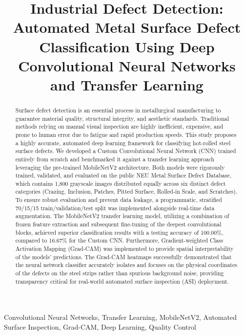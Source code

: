 \documentclass[conference, a4paper]{IEEEtran}
\begin{document}
\title{Industrial Defect Detection: Automated Metal Surface Defect Classification Using Deep Convolutional Neural Networks and Transfer Learning}

\author{
}

\maketitle

\begin{abstract}
Surface defect detection is an essential process in metallurgical manufacturing to guarantee material quality, structural integrity, and aesthetic standards. Traditional methods relying on manual visual inspection are highly inefficient, expensive, and prone to human error due to fatigue and rapid production speeds. This study proposes a highly accurate, automated deep learning framework for classifying hot-rolled steel surface defects. We developed a Custom Convolutional Neural Network (CNN) trained entirely from scratch and benchmarked it against a transfer learning approach leveraging the pre-trained MobileNetV2 architecture. Both models were rigorously trained, validated, and evaluated on the public NEU Metal Surface Defect Database, which contains 1,800 grayscale images distributed equally across six distinct defect categories (Crazing, Inclusion, Patches, Pitted Surface, Rolled-in Scale, and Scratches). To ensure robust evaluation and prevent data leakage, a programmatic, stratified 70/15/15 train/validation/test split was implemented alongside real-time data augmentation. The MobileNetV2 transfer learning model, utilizing a combination of frozen feature extraction and subsequent fine-tuning of the deepest convolutional blocks, achieved superior classification results with a testing accuracy of 100.00\%, compared to 16.67\% for the Custom CNN. Furthermore, Gradient-weighted Class Activation Mapping (Grad-CAM) was implemented to provide spatial interpretability of the models' predictions. The Grad-CAM heatmaps successfully demonstrated that the neural network classifier accurately isolates and focuses on the physical coordinates of the defects on the steel strips rather than spurious background noise, providing transparency critical for real-world automated surface inspection (ASI) deployment.
\end{abstract}

\begin{IEEEkeywords}
Convolutional Neural Networks, Transfer Learning, MobileNetV2, Automated Surface Inspection, Grad-CAM, Deep Learning, Quality Control
\end{IEEEkeywords}
\end{document}
